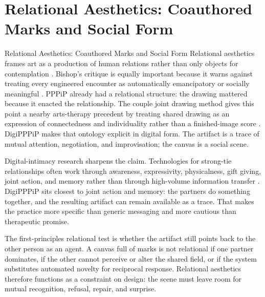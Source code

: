 \documentclass[
  ignorenonframetext,
]{beamer}
\author{\texorpdfstring{}{}}
\date{}
\begin{document}
\section{Relational Aesthetics: Coauthored Marks and Social
Form}\label{sec:relational_aesthetics}

\begin{frame}[allowframebreaks]{Relational Aesthetics: Coauthored Marks
and Social Form}
Relational aesthetics frames art as a production of human relations
rather than only objects for contemplation
. Bishop's critique is equally important
because it warns against treating every engineered encounter as
automatically emancipatory or socially meaningful
. PPPiP already had a relational structure:
the drawing mattered because it enacted the relationship. The couple
joint drawing method gives this point a nearby arts-therapy precedent by
treating shared drawing as an expression of connectedness and
individuality rather than a finished-image score .
DigiPPPiP makes that ontology explicit in digital form. The artifact is
a trace of mutual attention, negotiation, and improvisation; the canvas
is a social scene.

Digital-intimacy research sharpens the claim. Technologies for
strong-tie relationships often work through awareness, expressivity,
physicalness, gift giving, joint action, and memory rather than through
high-volume information transfer . DigiPPPiP sits closest to joint action and
memory: the partners do something together, and the resulting artifact
can remain available as a trace. That makes the practice more specific
than generic messaging and more cautious than therapeutic promise.

The first-principles relational test is whether the artifact still
points back to the other person as an agent. A canvas full of marks is
not relational if one partner dominates, if the other cannot perceive or
alter the shared field, or if the system substitutes automated novelty
for reciprocal response. Relational aesthetics therefore functions as a
constraint on design: the scene must leave room for mutual recognition,
refusal, repair, and surprise.


\end{frame}
\end{document}
